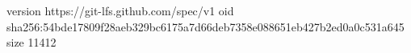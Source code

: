 version https://git-lfs.github.com/spec/v1
oid sha256:54bde17809f28aeb329bc6175a7d66deb7358e088651eb427b2ed0a0c531a645
size 11412
